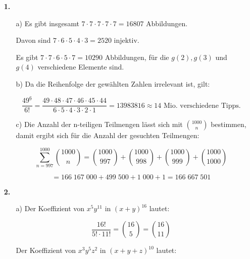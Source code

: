 \documentclass[a4paper,10pt]{scrartcl}
\author{\authorinfo}
\title{\titleinfo}
\date{\today}
\begin{document}
\setcounter{secnumdepth}{0}
\maketitle


\begin{enumerate}
    \item[\textbf{1.}]
        \begin{enumerate}
            \item[a)]
                Es gibt insgesamt $7 \cdot 7 \cdot 7 \cdot 7 \cdot 7 = 16807$ Abbildungen.

                Davon sind $7 \cdot 6 \cdot 5 \cdot 4 \cdot 3 = 2520$ injektiv.

                Es gibt $7 \cdot 7 \cdot 6 \cdot 5 \cdot 7 = 10290$ Abbildungen, für die $g(2), g(3)$ und $g(4)$
                verschiedene Elemente sind.

            \item[b)]
                Da die Reihenfolge der gewählten Zahlen irrelevant ist, gilt:

                $$\frac{49^{\underline{6}}}{6!} = \frac{49 \cdot 48 \cdot 47 \cdot 46 \cdot 45 \cdot 44}{6 \cdot 5 \cdot 4 \cdot 3 \cdot 2 \cdot 1} = 13983816 \approx 14 \text{ Mio. verschiedene Tipps.}$$

            \item[c)]
                Die Anzahl der n-teiligen Teilmengen lässt sich mit $\binom{1000}{n}$ bestimmen, damit ergibt sich für die
                Anzahl der gesuchten Teilmengen:

                $$\sum_{n=997}^{1000} \binom{1000}{n} = \binom{1000}{997} + \binom{1000}{998} + \binom{1000}{999} + \binom{1000}{1000}$$

                $$= 166\;167\;000 + 499\;500 + 1\;000 + 1 = 166\;667\;501$$
        \end{enumerate}

    \item[\textbf{2.}]
        \begin{enumerate}
            \item[a)]
                Der Koeffizient von $x^5y^{11}$ in $(x + y)^{16}$ lautet:

                $$\frac{16!}{5! \cdot 11!} = \binom{16}{5} = \binom{16}{11}$$

                Der Koeffizient von $x^3y^5z^2$ in $(x + y + z)^{10}$ lautet:


\end{enumerate}
\end{enumerate}
\end{document}
